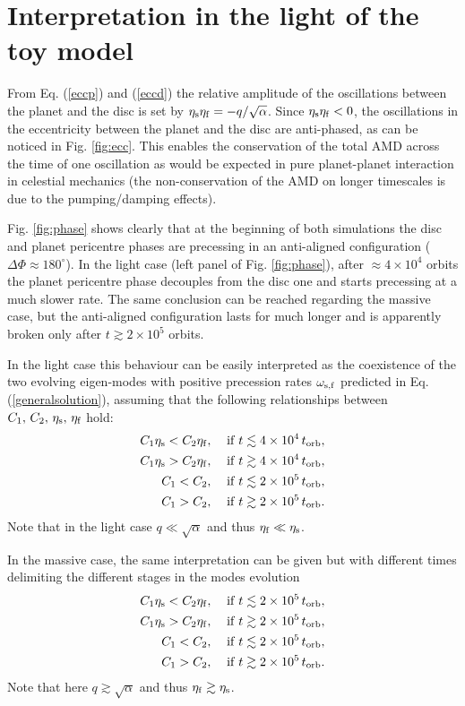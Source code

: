 \documentclass[usenatbib,a4paper,times,fleqn]{mnras}
\begin{document}
\section{Interpretation in the light of the toy model}\label{sec:toymodelinterp}

From Eq. (\ref{eccp}) and (\ref{eccd}) the relative amplitude of the oscillations between the planet and the disc is set by $\eta_{\rm s}\eta_{\rm f}=-q/\sqrt{\alpha}$. Since $\eta_{\rm s}\eta_{\rm f}<0$, the oscillations in the eccentricity between the planet and the disc are anti-phased, as can be noticed in Fig. \ref{fig:ecc}. This enables the conservation of the total AMD across the time of one oscillation as would be expected in pure planet-planet interaction in celestial mechanics (the non-conservation of the AMD on longer timescales is due to the pumping/damping effects). 

Fig. \ref{fig:phase} shows clearly that at the beginning of both simulations the disc and planet pericentre phases are precessing in an anti-aligned configuration ($\Delta\Phi\approx 180^\circ$). In the light case (left panel of Fig. \ref{fig:phase}), after $\approx 4\times 10^4$ orbits the planet pericentre phase decouples from the disc one and starts precessing at a much slower rate. The same conclusion can be reached regarding the massive case, but the anti-aligned configuration lasts for much longer and is apparently broken only after $t\gtrsim 2\times 10^5$ orbits.

In the light case this behaviour can be easily interpreted as the coexistence of the two evolving eigen-modes with positive precession rates $\omega_{\rm s,f}$ predicted in Eq. (\ref{generalsolution}), assuming that the following relationships between $C_1,\,C_2,\,\eta_{\rm s},\,\eta_{\rm f}$ hold:
\begin{align}
C_1\eta_{\rm s}<C_2\eta_{\rm f},&\quad \; {\rm if}\; t\lesssim 4\times 10^4\, t_{\rm orb},\\
C_1\eta_{\rm s} >C_2\eta_{\rm f},&\quad \; {\rm if}\; t\gtrsim 4\times 10^4\, t_{\rm orb},\\
C_1<C_2 ,&\quad \; {\rm if}\; t\lesssim 2\times 10^5\,t_{\rm orb},\\
C_1>C_2 ,&\quad \; {\rm if}\; t\gtrsim 2\times 10^5\,t_{\rm orb}.
\end{align}
Note that in the light case $q\ll\sqrt{\alpha}$ and thus $\eta_{\rm f}\ll \eta_{\rm s}$.

In the massive case, the same interpretation can be given but with different times delimiting the different stages in the modes evolution
\begin{align}
C_1\eta_{\rm s}<C_2\eta_{\rm f},&\quad \; {\rm if}\; t\lesssim2\times 10^5\, t_{\rm orb},\\
C_1\eta_{\rm s} >C_2\eta_{\rm f},&\quad \; {\rm if}\; t\gtrsim2\times 10^5\, t_{\rm orb},\\
C_1 <C_2 ,&\quad \; {\rm if}\; t\lesssim 2\times 10^5\,t_{\rm orb},\\
C_1 >C_2 ,&\quad \; {\rm if}\; t\gtrsim 2\times 10^5\,t_{\rm orb}.
\end{align}
Note that here $q\gtrsim \sqrt{\alpha}$ and thus $\eta_{\rm f}\gtrsim\eta_{\rm s}$.
\end{document}
